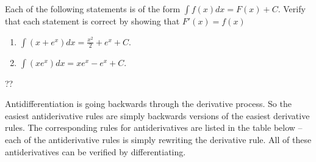 \begin{example}
Each of the following statements is of the form $\displaystyle\int f(x) dx=F(x)+C$. Verify that each statement is correct by showing that $F'(x)=f(x)$
\renewcommand{\labelenumi}{\textbf{(\alph{enumi})}}
\begin{enumerate}[leftmargin=*]
    \item $\displaystyle\int (x+e^x) dx=\frac{x^2}{2}+e^x+C$.  \newpage
    \item $\displaystyle\int (xe^x) dx=xe^x-e^x+C$. \vspace{0.5in}
\end{enumerate}

    \begin{sol}
    
    \end{sol}
    \begin{solL}
    ??
    \end{solL}

    
\end{example}

\noindent Antidifferentiation is going backwards through the derivative process. So the easiest antiderivative rules are simply backwards versions of the easiest derivative rules. The corresponding rules for antiderivatives are listed in the table below – each of the antiderivative rules is simply rewriting the derivative rule. All of these antiderivatives can be verified by differentiating.\\


